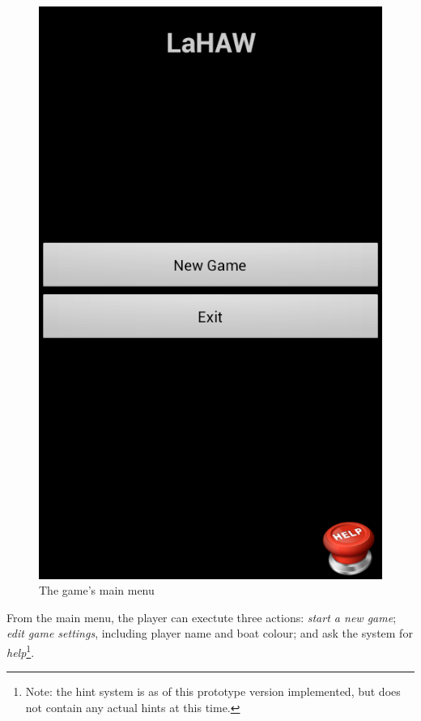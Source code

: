 \begin{figure}[ht]
    \includegraphics[width=\textwidth]{img/Screenshot_MainMenu.png}
    \caption{The game's main menu}
    \label{fig:Screenshot_MainMenu}
\end{figure}


From the main menu, the player can exectute three actions: \emph{start a new game}; \emph{edit game settings}, including player name and boat colour; and ask the system for \emph{help}\footnote{Note: the hint system is as of this prototype version implemented, but does not contain any actual hints at this time.}.

